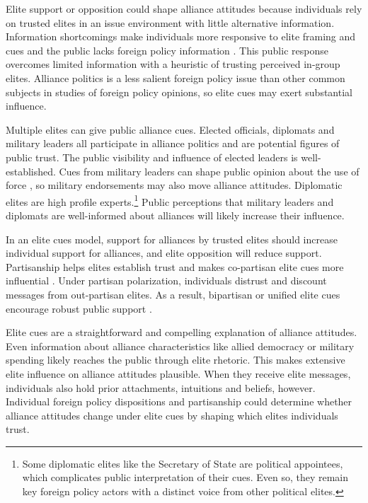 \documentclass[12pt]{article}
\begin{document}
Elite support or opposition could shape alliance attitudes because individuals rely on trusted elites in an issue environment with little alternative information. 
Information shortcomings make individuals more responsive to elite framing and cues \citep{Druckman2001, Peterson2017} and the public lacks foreign policy information \citep{BaumPotter2008}.
This public response overcomes limited information with a heuristic of trusting perceived in-group elites. 
Alliance politics is a less salient foreign policy issue than other common subjects in studies of foreign policy opinions, so elite cues may exert substantial influence.


Multiple elites can give public alliance cues.
Elected officials, diplomats and military leaders all participate in alliance politics and are potential figures of public trust.
The public visibility and influence of elected leaders is well-established.
Cues from military leaders can shape public opinion about the use of force \citep{Golbyetal2018}, so military endorsements may also move alliance attitudes. 
Diplomatic elites are high profile experts.\footnote{Some diplomatic elites like the Secretary of State are political appointees, which complicates public interpretation of their cues. Even so, they remain key foreign policy actors with a distinct voice from other political elites.}
Public perceptions that military leaders and diplomats are well-informed about alliances will likely increase their influence. 


In an elite cues model, support for alliances by trusted elites should increase individual support for alliances, and elite opposition will reduce support.   
Partisanship helps elites establish trust and makes co-partisan elite cues more influential \citep{Druckmanetal2013}.
Under partisan polarization, individuals distrust and discount messages from out-partisan elites.
As a result, bipartisan or unified elite cues encourage robust public support \citep{Berinsky2007}.


Elite cues are a straightforward and compelling explanation of alliance attitudes.
Even information about alliance characteristics like allied democracy or military spending likely reaches the public through elite rhetoric. 
This makes extensive elite influence on alliance attitudes plausible. 
When they receive elite messages, individuals also hold prior attachments, intuitions and beliefs, however.
Individual foreign policy dispositions and partisanship could determine whether alliance attitudes change under elite cues by shaping which elites individuals trust.
\end{document}
